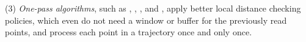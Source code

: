 \sstab (3) {\em One-pass algorithms}, such as \operb\cite{Lin:Operb}, \siped \cite{Williams:Longest,Sklansky:Cone,Dunham:Cone, Zhao:Sleeve}, \cised \cite{Lin:Cised}, \intersec\cite{Long:Direction} and \interval \cite{Ke:Interval}, apply better local distance checking policies, which even do not need a window or buffer for the previously read points, and process each point in a trajectory once and only once.




